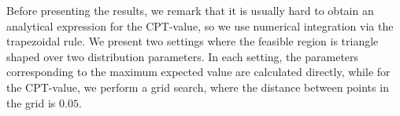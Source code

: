 Before presenting the results, we remark that it is usually hard to obtain an analytical expression for the CPT-value, so we use numerical integration via the trapezoidal rule. 
We present two settings where the feasible region is triangle shaped over two distribution parameters. In each setting, the parameters corresponding to the maximum expected value are calculated directly, while for the CPT-value, we perform a grid search, where the distance between points in the grid is $0.05$. 
